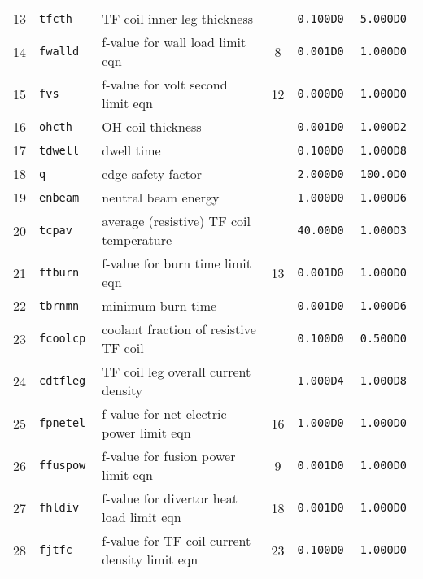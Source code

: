 \begin{table}[tbph]
\begin{center}
\begin{tabular}{||c|l|l|c|c|c||}
13  & \tt tfcth       & TF coil inner leg thickness                             &           & \tt 0.100D0  & \tt 5.000D0 \\
14  & \tt fwalld      & f-value for wall load limit eqn                         & 8         & \tt 0.001D0  & \tt 1.000D0 \\
15  & \tt fvs         & f-value for volt second limit eqn                       & 12        & \tt 0.000D0  & \tt 1.000D0 \\
16  & \tt ohcth       & OH coil thickness                                       &           & \tt 0.001D0  & \tt 1.000D2 \\
17  & \tt tdwell      & dwell time                                              &           & \tt 0.100D0  & \tt 1.000D8 \\
18  & \tt q           & edge safety factor                                      &           & \tt 2.000D0  & \tt 100.0D0 \\
19  & \tt enbeam      & neutral beam energy                                     &           & \tt 1.000D0  & \tt 1.000D6 \\
20  & \tt tcpav       & average (resistive) TF coil temperature                 &           & \tt 40.00D0  & \tt 1.000D3 \\
21  & \tt ftburn      & f-value for burn time limit eqn                         & 13        & \tt 0.001D0  & \tt 1.000D0 \\
22  & \tt tbrnmn      & minimum burn time                                       &           & \tt 0.001D0  & \tt 1.000D6 \\
23  & \tt fcoolcp     & coolant fraction of resistive TF coil                   &           & \tt 0.100D0  & \tt 0.500D0 \\
24  & \tt cdtfleg     & TF coil leg overall current density                     &           & \tt 1.000D4  & \tt 1.000D8 \\
25  & \tt fpnetel     & f-value for net electric power limit eqn                & 16        & \tt 1.000D0  & \tt 1.000D0 \\
26  & \tt ffuspow     & f-value for fusion power limit eqn                      & 9         & \tt 0.001D0  & \tt 1.000D0 \\
27  & \tt fhldiv      & f-value for divertor heat load limit eqn                & 18        & \tt 0.001D0  & \tt 1.000D0 \\
28  & \tt fjtfc       & f-value for TF coil current density limit eqn           & 23        & \tt 0.100D0  & \tt 1.000D0 \\

\end{tabular}
\end{center}
\end{table}
